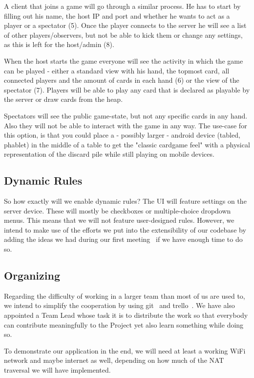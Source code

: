 \documentclass{sig-alternate}
\begin{document}
A client that joins a game will go through a similar process. He has to start by filling out his name, the host IP and port and whether he wants to act as a player or a spectator (5). Once the player connects to the server he will see a list of other players/observers, but not be able to kick them or change any settings, as this is left for the host/admin (8). 

When the host starts the game everyone will see the activity in which the game can be played - either a standard view with his hand, the topmost card, all connected players and the amount of cards in each hand (6) or the view of the spectator (7). Players will be able to play any card that is declared as playable by the server or draw cards from the heap.

Spectators will see the public game-state, but not any specific cards in any hand. Also they will not be able to interact with the game in any way. The use-case for this option, is that you could place a - possibly larger - android device (tabled, phablet) in the middle of a table to get the "classic cardgame feel" with a physical representation of the discard pile while still playing on mobile devices. 

\subsection{Dynamic Rules}
So how exactly will we enable dynamic rules? The UI will feature settings on the server device. These will mostly be checkboxes or multiple-choice dropdown menus. This means that we will not feature user-designed rules. However, we intend to make use of the efforts we put into the extensibility of our codebase by adding the ideas we had during our first meeting~\cite{firstprotocol} if we have enough time to do so.

\subsection{Organizing}

Regarding the difficulty of working in a larger team than most of us are used to, we intend to simplify the cooperation by using git~\cite{github} and trello~\cite{trello}. We have also appointed a Team Lead whose task it is to distribute the work so that everybody can contribute meaningfully to the Project yet also learn something while doing so.

To demonstrate our application in the end, we will need at least a working WiFi network and maybe internet as well, depending on how much of the NAT traversal we will have implemented.
\end{document}
